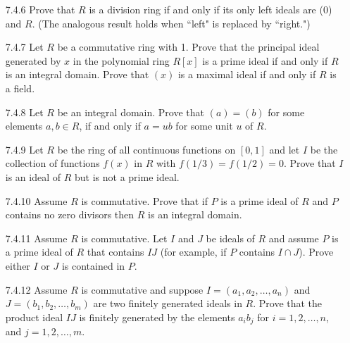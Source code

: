 \begin{enumerate}
   \item[7.4.6]   Prove that $R$ is a division ring if and only if its only left
                  ideals are (0) and $R$. (The analogous result holds when
                  ``left" is replaced by ``right.")
   \item[7.4.7]   Let $R$ be a commutative ring with 1. Prove that the principal
                  ideal generated by $x$ in the polynomial ring $R[x]$ is a
                  prime ideal if and only if $R$ is an integral domain. Prove
                  that $(x)$ is a maximal ideal if and only if $R$ is a field.
   \item[7.4.8]   Let $R$ be an integral domain. Prove that $(a) = (b)$ for some
                  elements $a, b \in R$, if and only if $a = ub$ for some unit
                  $u$ of $R$.
   \item[7.4.9]   Let $R$ be the ring of all continuous functions on $[0, 1]$
                  and let $I$ be the collection of functions $f(x)$ in $R$ with
                  $f(1/3) = f(1/2) = 0$. Prove that $I$ is an ideal of $R$ but
                  is not a prime ideal.
   \item[7.4.10]  Assume $R$ is commutative. Prove that if $P$ is a prime ideal
                  of $R$ and $P$ contains no zero divisors then $R$ is an
                  integral domain.
   \item[7.4.11]  Assume $R$ is commutative. Let $I$ and $J$ be ideals of $R$
                  and assume $P$ is a prime ideal of $R$ that contains $IJ$ (for
                  example, if $P$ contains $I \cap J$). Prove either $I$ or $J$
                  is contained in $P$.
   \item[7.4.12]  Assume $R$ is commutative and suppose
                  $I = (a_1, a_2, \ldots, a_n)$ and
                  $J = (b_1, b_2, \ldots, b_m)$ are two finitely generated
                  ideals in $R$. Prove that the product ideal $IJ$ is finitely
                  generated by the elements $a_ib_j$ for $i = 1, 2, \ldots, n$,
                  and $j = 1, 2, \ldots, m$.

\end{enumerate}
